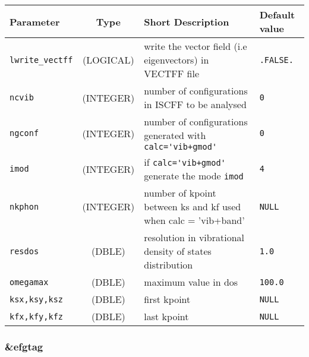 \documentclass[a4paper]{article}
\begin{document}
\begin{longtable}{l|c|m{8cm}|m{2cm}}
\hline
\hline
Parameter            &  Type              &          Short Description                                                          & Default value \\
\hline
\hline
\rule[-0.75cm]{0cm}{1.5cm}
\verb?lwrite_vectff? & (LOGICAL)          & write the vector field (i.e eigenvectors) in VECTFF file                            & \verb?.FALSE.?  \\
\hline
\rule[-0.75cm]{0cm}{1.5cm}
\verb?ncvib?         & (INTEGER)          & number of configurations in ISCFF to be analysed                                    & \verb?0? \\
\hline
\rule[-0.75cm]{0cm}{1.5cm}
\verb?ngconf?        & (INTEGER)          & number of configurations generated with \verb?calc='vib+gmod'?                      & \verb?0? \\
\hline
\rule[-0.75cm]{0cm}{1.5cm}
\verb?imod?          & (INTEGER)          & if \verb?calc='vib+gmod'? generate the mode \verb?imod?                             & \verb?4? \\
\hline
\rule[-0.75cm]{0cm}{1.5cm}
\verb?nkphon?        & (INTEGER)          & number of kpoint between ks and kf used when calc = 'vib+band'                      & \verb?NULL? \\
\hline
\rule[-0.75cm]{0cm}{1.5cm}
\verb?resdos?       & (DBLE)              & resolution in vibrational density of states distribution                            & \verb?1.0? \\
\hline
\rule[-0.75cm]{0cm}{1.5cm}
\verb?omegamax?     & (DBLE)              & maximum value in dos                                                                & \verb?100.0? \\
\hline
\rule[-0.75cm]{0cm}{1.5cm}
\verb?ksx,ksy,ksz?  & (DBLE)              & first kpoint & \verb?NULL? \\
\hline
\rule[-0.75cm]{0cm}{1.5cm}
\verb?kfx,kfy,kfz?  & (DBLE)              & last kpoint  & \verb?NULL? \\
\hline
\hline
\end{longtable}


\subsubsection{\&efgtag}
\end{document}
